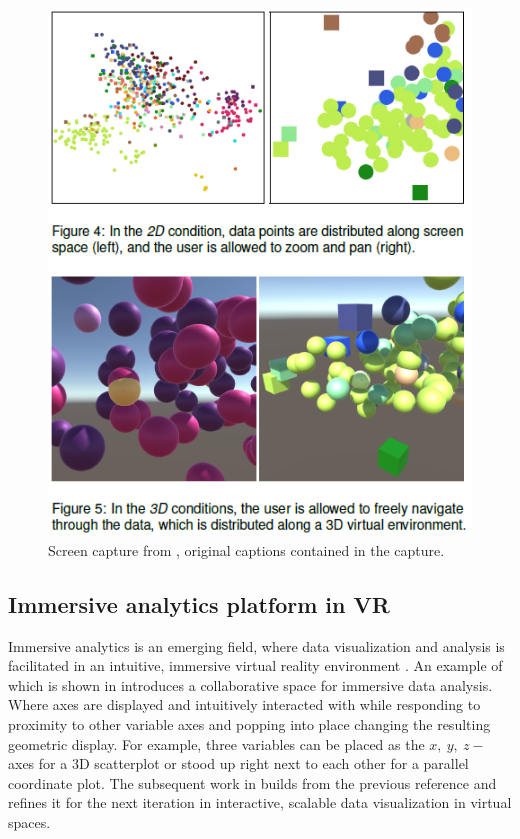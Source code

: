 \documentclass{monashthesis}
\begin{document}
\begin{figure}

{\centering \includegraphics[width=0.5\linewidth]{./figures/wagner18fig} 

}

\caption{Screen capture from
\textcite{wagner_filho_immersive_2018}, original captions contained in
the capture.}\label{fig:wagner18fig}
\end{figure}

\subsection{Immersive analytics platform in
VR}\label{immersive-analytics-platform-in-vr}

Immersive analytics is an emerging field, where data visualization and
analysis is facilitated in an intuitive, immersive virtual reality
environment \autocites{chandler_immersive_2015}{cordeil_immersive_2017}.
An example of which is shown in \textcite{cordeil_imaxes:_2017}
introduces a collaborative space for immersive data analysis. Where axes
are displayed and intuitively interacted with while responding to
proximity to other variable axes and popping into place changing the
resulting geometric display. For example, three variables can be placed
as the \(x,~y,~z-\) axes for a 3D scatterplot or stood up right next to
each other for a parallel coordinate plot. The subsequent work in
\textcite{cordeil_immersive_2019} builds from the previous reference and
refines it for the next iteration in interactive, scalable data
visualization in virtual spaces.
\end{document}
